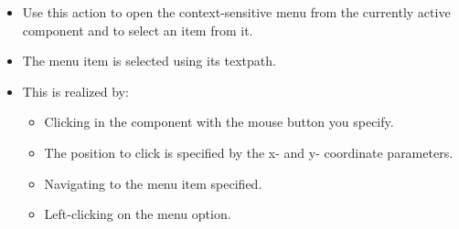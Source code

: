 
\begin{itemize}
\item Use this action to open the context-sensitive menu from the currently active component and to select an item from it.
\item The menu item is selected using its textpath. 
\item This is realized by:
\begin{itemize}
\item Clicking in the component with the mouse button you specify.
\item The position to click is specified by the x- and y- coordinate parameters.
\item Navigating to the menu item specified.
\item Left-clicking on the menu option.  
\end{itemize}
\end{itemize}


